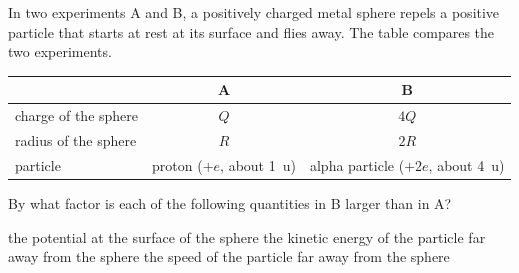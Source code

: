 In two experiments A and B, a positively charged metal sphere repels a positive particle that starts at rest at its surface and flies away. The table compares the two experiments.

\begin{center}
\begin{tabular}{lcc}
 & A & B \\ \hline
charge of the sphere & $Q$ & $4Q$ \\
radius of the sphere & $R$ & $2R$ \\
particle & proton ($+e$, about \SI{1}{\atomicmassunit}) & alpha particle ($+2e$, about \SI{4}{\atomicmassunit})
\end{tabular}
\end{center}

By what factor is each of the following quantities in B larger than in A?

\begin{abcliste}
\abc the potential at the surface of the sphere
\abc the kinetic energy of the particle far away from the sphere
\abc the speed of the particle far away from the sphere
\end{abcliste}
